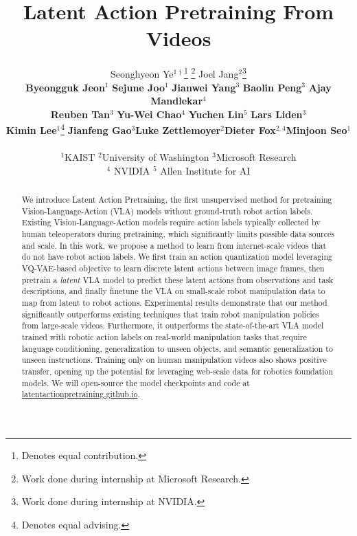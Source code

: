 \documentclass{article} %
\title{Latent Action Pretraining From Videos}
\author{Seonghyeon Ye$^{1 †}$\thanks{Denotes equal contribution.}
\thanks{Work done during internship at Microsoft Research.} \quad Joel Jang$^{2}$\footnotemark[1] 
  \thanks{Work done during internship at NVIDIA.} \\ 
\textbf{Byeongguk Jeon}$^{1}$ \quad \textbf{Sejune Joo}$^{1}$ \quad \textbf{Jianwei Yang}$^{3}$ \textbf{Baolin Peng}$^{3}$ \quad \textbf{Ajay Mandlekar}$^{4}$ \\
\textbf{Reuben Tan}$^{3}$ \quad \textbf{Yu-Wei Chao}$^{4}$ \quad \textbf{Yuchen Lin}$^{5}$ \quad 
\textbf{Lars Liden}$^{3}$ \quad  \\ 
\textbf{Kimin Lee}$^{1}$\thanks{Denotes equal advising.} \quad \textbf{Jianfeng Gao}$^{3}$\footnotemark[4] \quad \textbf{Luke Zettlemoyer}$^{2}$\footnotemark[4] \quad \textbf{Dieter Fox}$^{2,4}$\footnotemark[4] \quad \textbf{Minjoon Seo}$^{1}$\footnotemark[4] \\ \\
$^{1}$KAIST  \quad $^{2}$University of Washington \quad $^{3}$Microsoft Research \\ $^{4}$ NVIDIA \quad $^{5}$ Allen Institute for AI  
}
\begin{document}
\maketitle

\begin{abstract}
We introduce Latent Action Pretraining, the first unsupervised method for pretraining Vision-Language-Action (VLA) models without ground-truth robot action labels. Existing Vision-Language-Action models require action labels typically collected by human teleoperators during pretraining, which significantly limits possible data sources and scale. In this work, we propose a method to learn from internet-scale videos that do not have robot action labels. We first train an action quantization model leveraging VQ-VAE-based objective to learn discrete latent actions between image frames, then pretrain a \textit{latent} VLA model to predict these latent actions from observations and task descriptions, and finally finetune the VLA on small-scale robot manipulation data to map from latent to robot actions. 
Experimental results demonstrate that our method significantly outperforms existing techniques that train robot manipulation policies from large-scale videos. Furthermore, it outperforms the state-of-the-art VLA model trained with robotic action labels on real-world manipulation tasks that require language conditioning, generalization to unseen objects, and semantic generalization to unseen instructions. 
Training only on human manipulation videos also shows positive transfer, opening up the potential for leveraging web-scale data for robotics foundation model{s}. 
We will open-source the model checkpoints and code at \href{https://latentactionpretraining.github.io/}{latentactionpretraining.github.io}.
\end{abstract}
\end{document}
